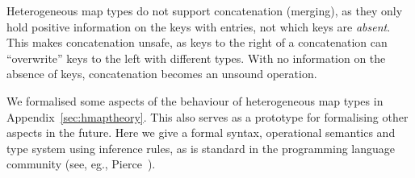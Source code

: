 Heterogeneous map types do not support concatenation (merging), as they
only hold positive information on the keys with entries, not
which keys are \emph{absent}.
This makes concatenation unsafe, as keys to the right of a
concatenation can ``overwrite'' keys to the left with different types. With no information
on the absence of keys, concatenation becomes an unsound operation.

We formalised some aspects of the behaviour of heterogeneous map types in Appendix~\ref{sec:hmaptheory}.
This also serves as a prototype for formalising other aspects in the future.
Here we give a formal syntax, operational semantics and type system using inference
rules, as is standard in the programming language community (see, eg., Pierce~\cite{Pie02}).

%
%
%



